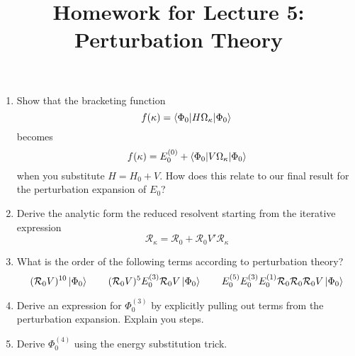 \documentclass{article}
\title{Homework for Lecture 5: Perturbation Theory}
\date{}
\newcommand{\Rz}{\mathcal{R}_{0}}
\begin{document}
\maketitle
\noindent
\begin{enumerate}
\item Show that the bracketing function 
\[f(\kappa) = \braket{\Phi_0 | H \Omega_\kappa | \Phi_0}\] 
becomes 
\[f(\kappa) = E^{(0)}_0 + \braket{\Phi_0 | V \Omega_\kappa | \Phi_0 } \]
when you substitute $H = H_0 + V$.
How does this relate to our final result for the
perturbation expansion of $E_0$?

\item Derive the analytic form the reduced resolvent starting from the iterative expression
\[\mathcal{R}_{\kappa} = \Rz +  \Rz V' \mathcal{R}_{\kappa} \]

\item What is the order of the following
terms according to perturbation theory?
\[ (\Rz V)^{10} \ket{\Phi_0} \quad \quad (\Rz V)^{5} E_0^{(3)} \Rz V \ket{\Phi_0} \quad \quad E_0^{(5)}E_0^{(3)}E_0^{(1)} \Rz \Rz \Rz V \ket{\Phi_0}\]

\item Derive an expression for $\Phi_0^{(3)}$ by explicitly 
pulling out terms from the perturbation expansion.
Explain you steps.

\item Derive $\Phi_0^{(4)}$ using the energy 
substitution trick.

\end{enumerate}
\end{document}
